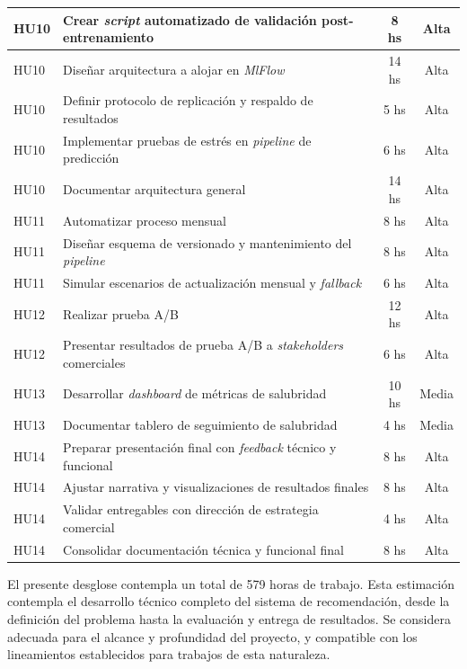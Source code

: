 \documentclass[
11pt, %
]{charter}
\begin{document}
\begin{longtable}{|p{2cm}|p{10cm}|c|c|}
HU10 & Crear \textit{script} automatizado de validación post-entrenamiento & 8 hs & Alta \\ \hline
HU10 & Diseñar arquitectura a alojar en \textit{MlFlow} & 14 hs & Alta \\ \hline
HU10 & Definir protocolo de replicación y respaldo de resultados & 5 hs & Alta \\ \hline
HU10 & Implementar pruebas de estrés en \textit{pipeline} de predicción & 6 hs & Alta \\ \hline
HU10 & Documentar arquitectura general & 14 hs & Alta \\ \hline

HU11 & Automatizar proceso mensual & 8 hs & Alta \\ \hline
HU11 & Diseñar esquema de versionado y mantenimiento del \textit{pipeline} & 8 hs & Alta \\ \hline
HU11 & Simular escenarios de actualización mensual y \textit{fallback} & 6 hs & Alta \\ \hline

HU12 & Realizar prueba A/B & 12 hs & Alta \\ \hline
HU12 & Presentar resultados de prueba A/B a \textit{stakeholders} comerciales & 6 hs & Alta \\ \hline

HU13 & Desarrollar \textit{dashboard} de métricas de salubridad & 10 hs & Media \\ \hline
HU13 & Documentar tablero de seguimiento de salubridad & 4 hs & Media \\ \hline

HU14 & Preparar presentación final con \textit{feedback} técnico y funcional & 8 hs & Alta \\ \hline
HU14 & Ajustar narrativa y visualizaciones de resultados finales & 8 hs & Alta \\ \hline
HU14 & Validar entregables con dirección de estrategia comercial & 4 hs & Alta \\ \hline
HU14 & Consolidar documentación técnica y funcional final & 8 hs & Alta \\ \hline

\end{longtable}

El presente desglose contempla un total de 579 horas de trabajo. Esta estimación contempla el desarrollo técnico completo del sistema de recomendación, desde la definición del problema hasta la evaluación y entrega de resultados. Se considera adecuada para el alcance y profundidad del proyecto, y compatible con los lineamientos establecidos para trabajos de esta naturaleza.
\end{document}
